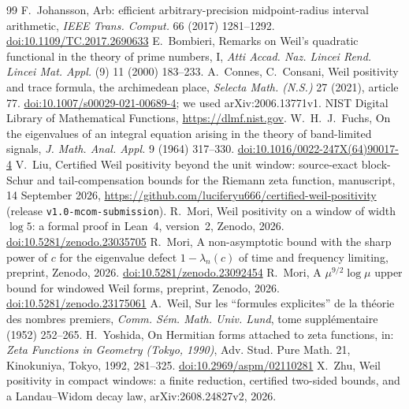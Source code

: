 \documentclass[11pt]{amsart}
\newcommand{\doi}[1]{\href{https://doi.org/#1}{doi:#1}}
\theoremstyle{remark}
\numberwithin{equation}{section}
\begin{document}
\begin{thebibliography}{99}
 F.~Johansson, Arb: efficient arbitrary-precision midpoint-radius interval arithmetic, \emph{IEEE Trans. Comput.} 66 (2017) 1281--1292. \doi{10.1109/TC.2017.2690633}
 E.~Bombieri, Remarks on Weil's quadratic functional in the theory of prime numbers, I, \emph{Atti Accad. Naz. Lincei Rend. Lincei Mat. Appl.} (9) 11 (2000) 183--233.
 A.~Connes, C.~Consani, Weil positivity and trace formula, the archimedean place, \emph{Selecta Math. (N.S.)} 27 (2021), article 77. \doi{10.1007/s00029-021-00689-4}; we used arXiv:2006.13771v1.
 NIST Digital Library of Mathematical Functions, \url{https://dlmf.nist.gov}.
 W.~H.~J.~Fuchs, On the eigenvalues of an integral equation arising in the theory of band-limited signals, \emph{J. Math. Anal. Appl.} 9 (1964) 317--330. \doi{10.1016/0022-247X(64)90017-4}
 V.~Liu, Certified Weil positivity beyond the unit window: source-exact block-Schur and tail-compensation bounds for the Riemann zeta function, manuscript, 14 September 2026, \url{https://github.com/luciferyu666/certified-weil-positivity} (release \texttt{v1.0-mcom-submission}).
 R.~Mori, Weil positivity on a window of width $\log5$: a formal proof in Lean~4, version~2, Zenodo, 2026. \doi{10.5281/zenodo.23035705}
 R.~Mori, A non-asymptotic bound with the sharp power of $c$ for the eigenvalue defect $1-\lambda_n(c)$ of time and frequency limiting, preprint, Zenodo, 2026. \doi{10.5281/zenodo.23092454}
 R.~Mori, A $\mu^{9/2}\log\mu$ upper bound for windowed Weil forms, preprint, Zenodo, 2026. \doi{10.5281/zenodo.23175061}
 A.~Weil, Sur les ``formules explicites'' de la th\'eorie des nombres premiers, \emph{Comm. S\'em. Math. Univ. Lund}, tome suppl\'ementaire (1952) 252--265.
 H.~Yoshida, On Hermitian forms attached to zeta functions, in: \emph{Zeta Functions in Geometry (Tokyo, 1990)}, Adv. Stud. Pure Math. 21, Kinokuniya, Tokyo, 1992, 281--325. \doi{10.2969/aspm/02110281}
 X.~Zhu, Weil positivity in compact windows: a finite reduction, certified two-sided bounds, and a Landau--Widom decay law, arXiv:2608.24827v2, 2026.
\end{thebibliography}
\end{document}
